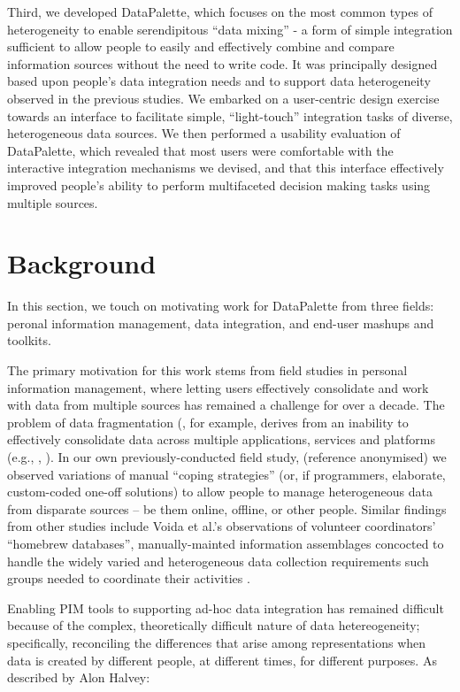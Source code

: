 \documentclass{sigchi}
\begin{document}
Third, we developed DataPalette, which focuses on the most common types of heterogeneity to enable serendipitous ``data mixing'' - a form of simple integration sufficient to allow people to easily and effectively combine and compare information sources without the need to write code.  It was principally designed based upon people's data integration needs and to support data heterogeneity observed in the previous studies.  We embarked on a user-centric design exercise towards an interface to facilitate simple, ``light-touch'' integration tasks of diverse, heterogeneous data sources.  We then performed a usability evaluation of DataPalette, which revealed that most users were comfortable with the interactive integration mechanisms we devised, and that this interface effectively improved people's ability to perform multifaceted decision making tasks using multiple sources.

\section{Background}

In this section, we touch on motivating work for DataPalette from three fields: peronal information management, data integration, and end-user mashups and toolkits.

The primary motivation for this work stems from field studies in personal information management, where letting users effectively consolidate and work with data from multiple sources has remained a challenge for over a decade. The problem of data fragmentation (\cite{Jones05towardsa}, for example, derives from an inability to effectively consolidate data across multiple applications, services and platforms (e.g., \cite{bergman}, \cite{boardmansasse}). In our own previously-conducted field study, (reference anonymised) we observed variations of manual ``coping strategies'' (or, if programmers, elaborate, custom-coded one-off solutions) to allow people to manage heterogeneous data from disparate sources -- be them online, offline, or other people.  Similar findings from other studies include Voida et al.'s observations of volunteer coordinators' ``homebrew databases'', manually-mainted information assemblages concocted to handle the widely varied and heterogeneous data collection requirements such groups needed to coordinate their activities \cite{Voida:2011:HDC:1978942.1979078}.

Enabling PIM tools to supporting ad-hoc data integration has remained difficult because of the complex, theoretically difficult nature of data hetereogeneity; specifically, reconciling the differences that arise among representations when data is created by different people, at different times, for different purposes. As described by Alon Halvey:
\end{document}
